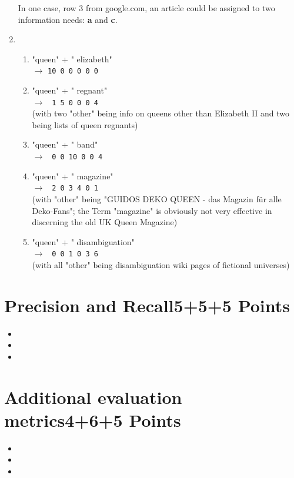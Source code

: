 \documentclass[10pt,a4paper]{article}
\begin{document}
\begin{enumerate}
        In one case, row 3 from google.com, an article could be assigned to two information needs: \textbf{a} and \textbf{c}.
    \item \begin{enumerate}
            \item "queen" + " elizabeth"\\
                $\rightarrow$ \texttt{10  0  0  0  0  0}
            \item "queen" + " regnant"\\
                $\rightarrow$ \texttt{ 1  5  0  0  0  4}
                \\(with two "other" being info on queens other than Elizabeth II and two being lists of queen regnants)
            \item "queen" + " band"\\
                $\rightarrow$ \texttt{ 0  0 10  0  0  4}
            \item "queen" + " magazine"\\
                $\rightarrow$ \texttt{ 2  0  3  4  0  1}\\
                (with "other" being "GUIDOS DEKO QUEEN - das Magazin für alle Deko-Fans"; the Term "magazine" is obviously not very effective in discerning the old UK Queen Magazine)
            \item "queen" + " disambiguation"\\
                $\rightarrow$ \texttt{ 0  0  1  0  3  6}\\
                (with all "other" being disambiguation wiki pages of fictional universes)
        \end{enumerate}
\end{enumerate}


\section{\hfill Precision and Recall\hfill 5+5+5 Points}
\begin{itemize}
    \item 
    \item 
    \item 
\end{itemize}


\section{\hfill Additional evaluation metrics\hfill 4+6+5 Points}
\begin{itemize}
    \item 
    \item 
    \item 
\end{itemize}
\end{document}
